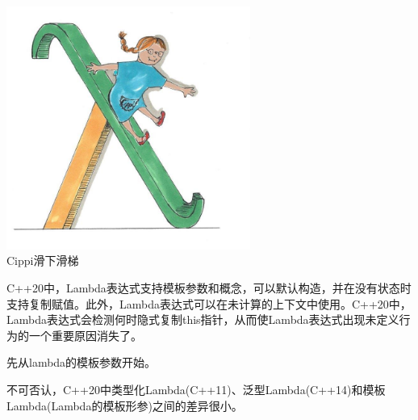\begin{center}
\includegraphics[width=0.6\textwidth]{content/3/chapter4/images/41.png}\\
Cippi滑下滑梯
\end{center}

C++20中，Lambda表达式支持模板参数和概念，可以默认构造，并在没有状态时支持复制赋值。此外，Lambda表达式可以在未计算的上下文中使用。C++20中，Lambda表达式会检测何时隐式复制this指针，从而使Lambda表达式出现未定义行为的一个重要原因消失了。

先从lambda的模板参数开始。


不可否认，C++20中类型化Lambda(C++11)、泛型Lambda(C++14)和模板Lambda(Lambda的模板形参)之间的差异很小。

